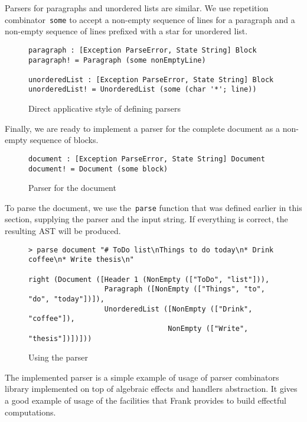       Parsers for paragraphs and unordered lists are similar. We use repetition
      combinator~\texttt{some} to accept a non-empty sequence of lines for a paragraph and
      a non-empty sequence of lines prefixed with a star for unordered list.

      \begin{figure}[h]
      \begin{lstlisting}
paragraph : [Exception ParseError, State String] Block
paragraph! = Paragraph (some nonEmptyLine)

unorderedList : [Exception ParseError, State String] Block
unorderedList! = UnorderedList (some (char '*'; line))
      \end{lstlisting}
      \caption{Direct applicative style of defining parsers}
      \label{listing:parserExprAppCombo}
      \end{figure}

      Finally, we are ready to implement a parser for the complete document as a
      non-empty sequence of blocks.

      \begin{figure}[h]
      \begin{lstlisting}
document : [Exception ParseError, State String] Document
document! = Document (some block)
      \end{lstlisting}
      \caption{Parser for the document}
      \label{listing:parserMdDocCombo}
      \end{figure}

      To parse the document, we use the~\texttt{parse} function that was defined earlier
      in this section, supplying the parser and the input string. If everything is
      correct, the resulting AST will be produced.


      \begin{figure}[h]
      \begin{lstlisting}
> parse document "# ToDo list\nThings to do today\n* Drink coffee\n* Write thesis\n"

right (Document ([Header 1 (NonEmpty (["ToDo", "list"])),
                  Paragraph ([NonEmpty (["Things", "to", "do", "today"])]),
                  UnorderedList ([NonEmpty (["Drink", "coffee"]),
                                 NonEmpty (["Write", "thesis"])])]))
      \end{lstlisting}
      \caption{Using the parser}
      \label{listing:parserExprMainCombo}
      \end{figure}

      The implemented parser is a simple example of usage of parser combinators library
      implemented on top of algebraic effects and handlers abstraction. It gives a
      good example of usage of the facilities that Frank provides to build
      effectful computations.

